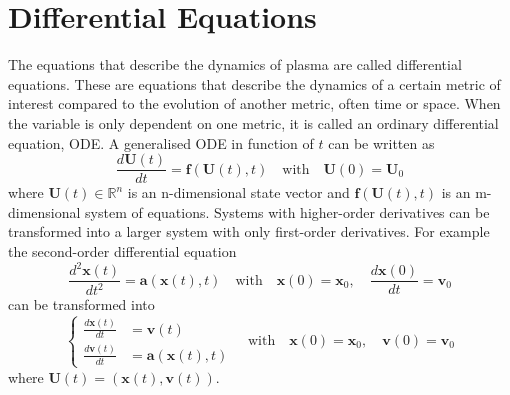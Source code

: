\section{Differential Equations}
\label{sec: DE}
The equations that describe the dynamics of plasma are called differential equations. These are equations that describe the dynamics of a certain metric of interest compared to the evolution of another metric, often time or space. When the variable is only dependent on one metric, it is called an ordinary differential equation, ODE. A generalised ODE in function of $t$ can be written as 
\begin{equation}
\label{eq: ODE}
    \frac{d \textbf{U}(t)}{d t} = \textbf{f}(\textbf{U}(t),t) \quad \text{with} \quad \textbf{U}(0) = \textbf{U}_0
    \end{equation}
where $\textbf{U}(t) \in \mathbb{R}^n$ is an n-dimensional state vector and $\textbf{f}(\textbf{U}(t), t)$ is an m-dimensional system of equations. Systems with higher-order derivatives can be transformed into a larger system with only first-order derivatives. For example the second-order differential equation
\begin{equation*}
    \frac{d^2 \textbf{x}(t)}{d t^2} = \textbf{a}(\textbf{x}(t),t) \quad \text{with} \quad \textbf{x}(0) = \textbf{x}_0, \quad \frac{d \textbf{x}(0)}{d t} = \textbf{v}_0
\end{equation*}
can be transformed into
\begin{equation*}
    \left\{ \begin{aligned} 
      \frac{d \textbf{x}(t)}{d t} &= \textbf{v}(t) \\
      \frac{d \textbf{v}(t)}{d t} &= \textbf{a}(\textbf{x}(t),t)
    \end{aligned} \right.
    \quad \text{with} \quad \textbf{x}(0) = \textbf{x}_0, \quad \textbf{v}(0) = \textbf{v}_0
\end{equation*}
where $\textbf{U}(t) = (\textbf{x}(t), \textbf{v}(t))$.


